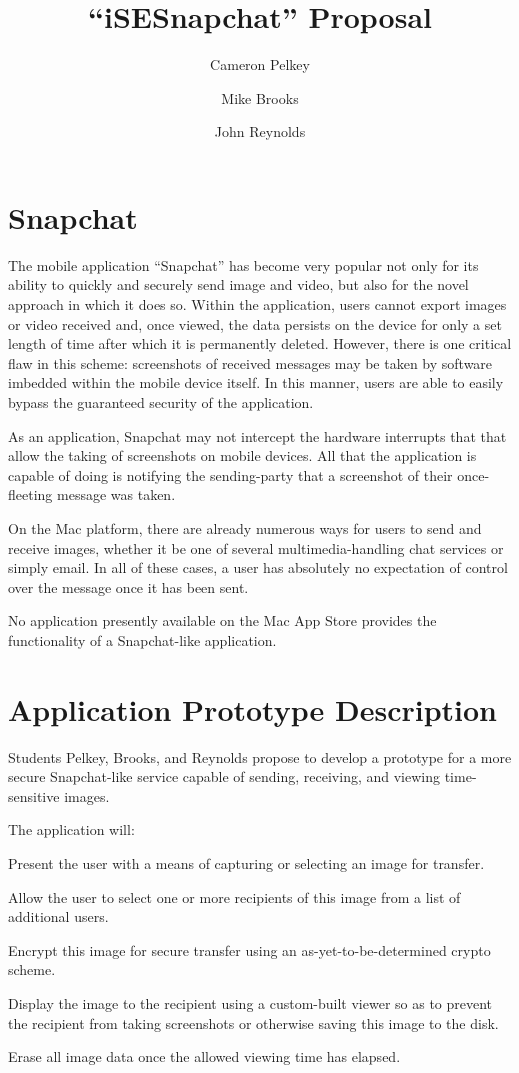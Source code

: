 \documentclass[11pt, oneside]{article}
\title{``iSESnapchat'' Proposal}
\author{Cameron Pelkey \and Mike Brooks \and John Reynolds}
\date{}
\begin{document}
\maketitle

\section{Snapchat}
The mobile application ``Snapchat'' has become very popular not only for its ability to quickly and securely send image and video, but also for the novel approach in which it does so. Within the application, users cannot export images or video received and, once viewed, the data persists on the device for only a set length of time after which it is permanently deleted. However, there is one critical flaw in this scheme: screenshots of received messages may be taken by software imbedded within the mobile device itself. In this manner, users are able to easily bypass the guaranteed security of the application.

As an application, Snapchat may not intercept the hardware interrupts that that allow the taking of screenshots on mobile devices. All that the application is capable of doing is notifying the sending-party that a screenshot of their once-fleeting message was taken.

On the Mac platform, there are already numerous ways for users to send and receive images, whether it be one of several multimedia-handling chat services or simply email. In all of these cases, a user has absolutely no expectation of control over the message once it has been sent.

No application presently available on the Mac App Store provides the functionality of a Snapchat-like application.

\section{Application Prototype Description}
Students Pelkey, Brooks, and Reynolds propose to develop a prototype for a more secure Snapchat-like service capable of sending, receiving, and viewing time-sensitive images.

The application will:
\begin{itemize*}
	\item {Present the user with a means of capturing or selecting an image for transfer.}
	\item {Allow the user to select one or more recipients of this image from a list of additional users.}
	\item {Encrypt this image for secure transfer using an as-yet-to-be-determined crypto scheme.}
	\item {Display the image to the recipient using a custom-built viewer so as to prevent the recipient from taking screenshots or otherwise saving this image to the disk.}
	\item {Erase all image data once the allowed viewing time has elapsed.}
\end{itemize*} 
\end{document}
